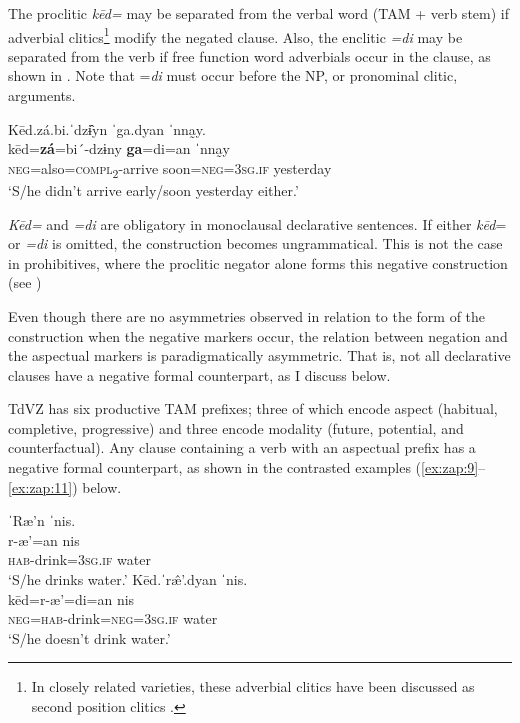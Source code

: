 \documentclass[output=paper,colorlinks=true, citecolor=brown]{langscibook}
\begin{document}
The proclitic \textit{kēd=} may be separated from the verbal word (TAM + verb stem) if adverbial clitics\footnote{In closely related varieties, these adverbial clitics have been discussed as second position clitics \citep{Munro2004}.}  modify the negated clause. Also, the enclitic \textit{=di} may be separated from the verb if free function word adverbials occur in the clause, as shown in . Note that =\textit{di} must occur before the NP, or pronominal clitic, arguments.

\ea\label{ex:zap:8} 
    \glll Kēd.zá.bi.ˈdzɨ̂yn ˈga.dyan ˈnna̰y.\\ 
          kēd=\textbf{zá}=bi´-dzɨny \textbf{ga}=di=an ˈnna̰y\\
          \textsc{neg}=also=\textsc{compl}\textsc{\textsubscript{2}}{}-arrive soon=\textsc{neg=3sg.if} yesterday\\
    \glt ‘S/he didn’t arrive early/soon yesterday either.’
\z 

\textit{Kēd=} and \textit{=di} are obligatory in monoclausal declarative sentences. If either \textit{kēd}= or \textit{=di} is omitted, the construction becomes ungrammatical. This is not the case in prohibitives, where the proclitic negator alone forms this negative construction (see )

Even though there are no asymmetries observed in relation to the form of the construction when the negative markers occur, the relation between negation and the aspectual markers is paradigmatically asymmetric. That is, not all declarative clauses have a negative formal counterpart, as I discuss below. 

\largerpage
TdVZ has six productive TAM prefixes; three of which encode aspect (habitual, completive, progressive) and three encode modality (future, potential, and counterfactual). Any clause containing a verb with an aspectual prefix has a negative formal counterpart, as shown in the contrasted examples (\ref{ex:zap:9}--\ref{ex:zap:11}) below.


\ea\label{ex:zap:9}
    \ea\label{ex:zap:9a}
        \glll  ˈRæ’n ˈnis.\\ 
               r-æ’=an nis\\
              \textsc{hab}{}-drink=\textsc{3sg.if} water \\
        \glt ‘S/he drinks water.’
    \ex\label{ex:zap:9b}
        \glll  Kēd.ˈr\^{æ}’.dyan ˈnis.\\
              kēd=r-æ’=di=an nis\\
               \textsc{neg}=\textsc{hab}{}-drink=\textsc{neg}=\textsc{3sg.if} water\\
        \glt ‘S/he doesn’t drink water.’
    \z
\z 
\end{document}
